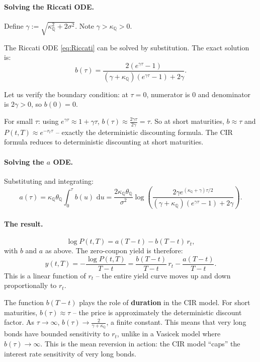 \documentclass[11pt]{article}
\newcommand{\QQ}{\mathbb{Q}}
\newcommand{\dd}{\,\mathrm{d}}
\begin{document}
\paragraph{Solving the Riccati ODE.}  Define
$\gamma := \sqrt{\kappa_\QQ^2 + 2\sigma^2}$.  Note $\gamma > \kappa_\QQ > 0$.

The Riccati ODE \eqref{eq:Riccati} can be solved by substitution.  The
exact solution is:
\[
b(\tau) = \frac{2(e^{\gamma\tau}-1)}
{(\gamma+\kappa_\QQ)(e^{\gamma\tau}-1)+2\gamma}.
\]

Let us verify the boundary condition: at $\tau=0$, numerator is $0$ and
denominator is $2\gamma > 0$, so $b(0) = 0$. \checkmark

For small $\tau$: using $e^{\gamma\tau} \approx 1+\gamma\tau$,
$b(\tau) \approx \frac{2\gamma\tau}{2\gamma} = \tau$.  So at short
maturities, $b\approx\tau$ and $P(t,T)\approx e^{-r_t\tau}$ -- exactly
the deterministic discounting formula.  The CIR formula reduces to
deterministic discounting at short maturities.

\paragraph{Solving the $a$ ODE.}
Substituting and integrating:
\[
a(\tau)
= \kappa_\QQ\theta_\QQ\int_0^\tau b(u)\,\dd u
= \frac{2\kappa_\QQ\theta_\QQ}{\sigma^2}
\log\!\left(
\frac{2\gamma e^{(\kappa_\QQ+\gamma)\tau/2}}
{(\gamma+\kappa_\QQ)(e^{\gamma\tau}-1)+2\gamma}
\right).
\]

\paragraph{The result.}
\[
\boxed{
\log P(t,T) = a(T-t) - b(T-t)\,r_t,
}
\]
with $b$ and $a$ as above.  The zero-coupon yield is therefore:
\[
y(t,T) = -\frac{\log P(t,T)}{T-t} = \frac{b(T-t)}{T-t}\,r_t - \frac{a(T-t)}{T-t}.
\]
This is a linear function of $r_t$ -- the entire yield curve moves up and
down proportionally to $r_t$.

\begin{intuition}
The function $b(T-t)$ plays the role of \textbf{duration} in the CIR
model.  For short maturities, $b(\tau)\approx \tau$ -- the price is
approximately the deterministic discount factor.  As $\tau\to\infty$,
$b(\tau) \to \frac{2}{\gamma+\kappa_\QQ}$, a finite constant.  This means
that very long bonds have bounded sensitivity to $r_t$, unlike in a
Vasicek model where $b(\tau)\to\infty$.  This is the mean reversion in
action: the CIR model ``caps'' the interest rate sensitivity of very long
bonds.
\end{intuition}
\end{document}
